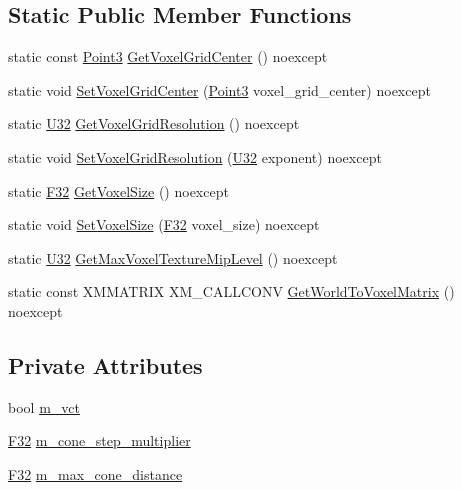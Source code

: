 \subsection*{Static Public Member Functions}
\begin{DoxyCompactItemize}
\item 
static const \hyperlink{structmage_1_1_point3}{Point3} \hyperlink{classmage_1_1rendering_1_1_voxelization_settings_a3607b62516e690c192d356b59375ba18}{Get\+Voxel\+Grid\+Center} () noexcept
\item 
static void \hyperlink{classmage_1_1rendering_1_1_voxelization_settings_ad4a2dd741cdd4187eaaa2492fb1ca533}{Set\+Voxel\+Grid\+Center} (\hyperlink{structmage_1_1_point3}{Point3} voxel\+\_\+grid\+\_\+center) noexcept
\item 
static \hyperlink{namespacemage_a41c104c036fba3756a74e19f793eeaa1}{U32} \hyperlink{classmage_1_1rendering_1_1_voxelization_settings_a81a186bbca9250f2021fb4bbeff6f831}{Get\+Voxel\+Grid\+Resolution} () noexcept
\item 
static void \hyperlink{classmage_1_1rendering_1_1_voxelization_settings_aeffbe093b1df8a738906db2249961ed8}{Set\+Voxel\+Grid\+Resolution} (\hyperlink{namespacemage_a41c104c036fba3756a74e19f793eeaa1}{U32} exponent) noexcept
\item 
static \hyperlink{namespacemage_aa97e833b45f06d60a0a9c4fc22ae02c0}{F32} \hyperlink{classmage_1_1rendering_1_1_voxelization_settings_ae9c6e798bef7bbbb3031026eccbe6873}{Get\+Voxel\+Size} () noexcept
\item 
static void \hyperlink{classmage_1_1rendering_1_1_voxelization_settings_a4e1c575474a1301981bc0a0070c2c841}{Set\+Voxel\+Size} (\hyperlink{namespacemage_aa97e833b45f06d60a0a9c4fc22ae02c0}{F32} voxel\+\_\+size) noexcept
\item 
static \hyperlink{namespacemage_a41c104c036fba3756a74e19f793eeaa1}{U32} \hyperlink{classmage_1_1rendering_1_1_voxelization_settings_aacf64e0e4be2e7260793dfefe7f332cb}{Get\+Max\+Voxel\+Texture\+Mip\+Level} () noexcept
\item 
static const X\+M\+M\+A\+T\+R\+IX X\+M\+\_\+\+C\+A\+L\+L\+C\+O\+NV \hyperlink{classmage_1_1rendering_1_1_voxelization_settings_ac0eb16df3bfae7218b27e1c1cdf1399f}{Get\+World\+To\+Voxel\+Matrix} () noexcept
\end{DoxyCompactItemize}
\subsection*{Private Attributes}
\begin{DoxyCompactItemize}
\item 
bool \hyperlink{classmage_1_1rendering_1_1_voxelization_settings_ac2edf702f2441db192bef28ec616b873}{m\+\_\+vct}
\item 
\hyperlink{namespacemage_aa97e833b45f06d60a0a9c4fc22ae02c0}{F32} \hyperlink{classmage_1_1rendering_1_1_voxelization_settings_a4d58d4ab9b43d2631415da65321a8c83}{m\+\_\+cone\+\_\+step\+\_\+multiplier}
\item 
\hyperlink{namespacemage_aa97e833b45f06d60a0a9c4fc22ae02c0}{F32} \hyperlink{classmage_1_1rendering_1_1_voxelization_settings_adb6172810eba8f59553bcbb9e2a7cbe3}{m\+\_\+max\+\_\+cone\+\_\+distance}
\end{DoxyCompactItemize}
